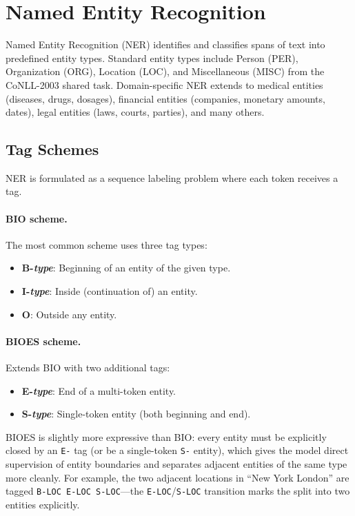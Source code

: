 \section{Named Entity Recognition}
\label{sec:ner}

Named Entity Recognition (NER) identifies and classifies spans of text into predefined entity
types.  Standard entity types include Person (PER), Organization (ORG), Location (LOC), and
Miscellaneous (MISC) from the CoNLL-2003 shared task.  Domain-specific NER extends to medical
entities (diseases, drugs, dosages), financial entities (companies, monetary amounts, dates),
legal entities (laws, courts, parties), and many others.

\subsection{Tag Schemes}

NER is formulated as a sequence labeling problem where each token receives a tag.

\paragraph{BIO scheme.}
The most common scheme uses three tag types:
\begin{itemize}
    \item \textbf{B-\textit{type}}: Beginning of an entity of the given type.
    \item \textbf{I-\textit{type}}: Inside (continuation of) an entity.
    \item \textbf{O}: Outside any entity.
\end{itemize}

\paragraph{BIOES scheme.}
Extends BIO with two additional tags:
\begin{itemize}
    \item \textbf{E-\textit{type}}: End of a multi-token entity.
    \item \textbf{S-\textit{type}}: Single-token entity (both beginning and end).
\end{itemize}
BIOES is slightly more expressive than BIO: every entity must be explicitly closed by an
\texttt{E-} tag (or be a single-token \texttt{S-} entity), which gives the model direct
supervision of entity boundaries and separates adjacent entities of the same type more
cleanly.  For example, the two adjacent locations in ``New York London'' are tagged
\texttt{B-LOC E-LOC S-LOC}---the \texttt{E-LOC}/\texttt{S-LOC} transition marks the split
into two entities explicitly.

